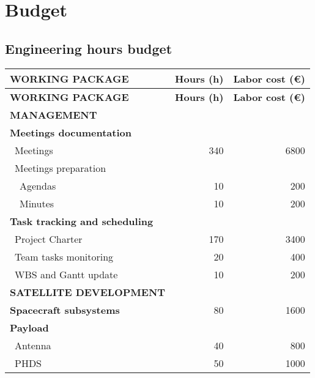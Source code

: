 %

\section{Budget}
\subsection{Engineering hours budget}

\begin{longtable}{| l | r | r | }
\hline
\rowcolor[gray]{0.65}	\textbf{WORKING PACKAGE} &  \textbf{Hours (h)}     & \textbf{Labor cost (\euro)}   \\ \hline
\hline
\endfirsthead

\hline
\rowcolor[gray]{0.65}	\textbf{WORKING PACKAGE} &  \textbf{Hours (h)}     & \textbf{Labor cost (\euro)}   \\
\hline
\endhead

\rowcolor[gray]{0.85} \textbf{MANAGEMENT} &  &  \\

	\textbf{Meetings documentation} & & \\
	   \blue ~Meetings & 340  & 6800  \\
	   \blue ~Meetings preparation & &   \\
	   ~~Agendas & 10 & 200 \\
	   ~~Minutes & 10 & 200 \\
	\hline
	\textbf{Task tracking and scheduling} & & \\
	   \blue ~Project Charter & 170 & 3400  \\
	   \blue ~Team tasks monitoring & 20 & 400  \\
	   \blue ~WBS and Gantt update & 10 & 200 \\

\rowcolor[gray]{0.85}	\textbf{SATELLITE DEVELOPMENT} &  &   \\
	
	\textbf{Spacecraft subsystems} & 80  & 1600 \\
	\hline
	\textbf{Payload} &   &  \\
	   \blue ~Antenna & 40  & 800  \\
	   \blue ~PHDS & 50  & 1000  \\


\end{longtable}
